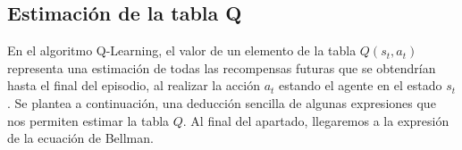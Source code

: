 \documentclass{article}
\begin{document}






\subsection{Estimación de la tabla Q}
En el algoritmo Q-Learning, el valor de un elemento de la tabla $Q(s_t,a_t)$ representa una estimación de todas las recompensas futuras que se obtendrían hasta el final del episodio, al realizar la acción $a_t$ estando el agente en el estado $s_t$. %
Se plantea a continuación, una deducción sencilla de algunas expresiones que nos permiten estimar la tabla $Q$. Al final del apartado, llegaremos a la expresión de la ecuación de Bellman. 
\end{document}
